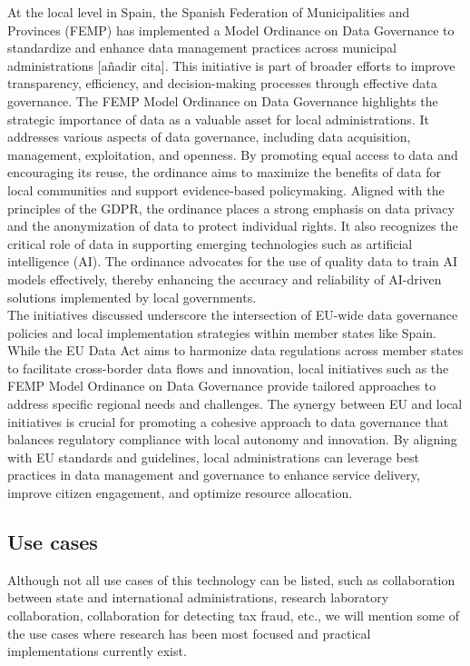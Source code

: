 At the local level in Spain, the Spanish Federation of Municipalities and Provinces (FEMP) has implemented a Model Ordinance on Data Governance to standardize and enhance data management practices across municipal administrations [añadir cita]. This initiative is part of broader efforts to improve transparency, efficiency, and decision-making processes through effective data governance. The FEMP Model Ordinance on Data Governance highlights the strategic importance of data as a valuable asset for local administrations. It addresses various aspects of data governance, including data acquisition, management, exploitation, and openness. By promoting equal access to data and encouraging its reuse, the ordinance aims to maximize the benefits of data for local communities and support evidence-based policymaking.
Aligned with the principles of the GDPR, the ordinance places a strong emphasis on data privacy and the anonymization of data to protect individual rights. It also recognizes the critical role of data in supporting emerging technologies such as artificial intelligence (AI). The ordinance advocates for the use of quality data to train AI models effectively, thereby enhancing the accuracy and reliability of AI-driven solutions implemented by local governments.\\

The initiatives discussed underscore the intersection of EU-wide data governance policies and local implementation strategies within member states like Spain. While the EU Data Act aims to harmonize data regulations across member states to facilitate cross-border data flows and innovation, local initiatives such as the FEMP Model Ordinance on Data Governance provide tailored approaches to address specific regional needs and challenges. The synergy between EU and local initiatives is crucial for promoting a cohesive approach to data governance that balances regulatory compliance with local autonomy and innovation. By aligning with EU standards and guidelines, local administrations can leverage best practices in data management and governance to enhance service delivery, improve citizen engagement, and optimize resource allocation.


\subsection{Use cases}

Although not all use cases of this technology can be listed, such as collaboration between state and international administrations, research laboratory collaboration, collaboration for detecting tax fraud, etc., we will mention some of the use cases where research has been most focused and practical implementations currently exist.


